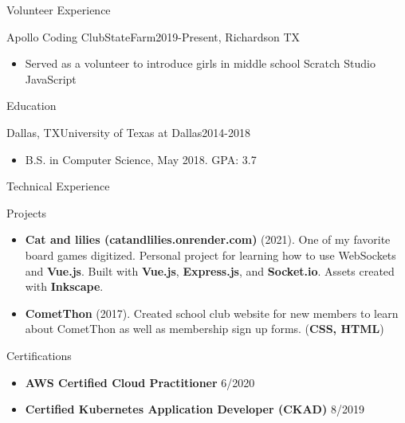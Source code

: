 \documentclass[]{lau}
\begin{document}
	\begin{cvsection}{Volunteer Experience}
		\begin{cvsubsection}{Apollo Coding Club}{StateFarm}{2019-Present, Richardson TX}
			\begin{itemize}
				\item Served as a volunteer to introduce girls in middle school Scratch Studio JavaScript
			\end{itemize}
		\end{cvsubsection}
	\end{cvsection}

	\begin{cvsection}{Education}
		\begin{cvsubsection}{Dallas, TX}{University of Texas at Dallas}{2014-2018}
			\begin{itemize}
				\item B.S. in Computer Science, May 2018. GPA: 3.7
			\end{itemize}
		\end{cvsubsection}
	\end{cvsection}

	\begin{cvsection}{Technical Experience}
		\begin{cvsubsection}{Projects}{}{}
			\begin{itemize}
				\item \textbf{Cat and lilies (catandlilies.onrender.com)} (2021). One of my favorite board games digitized. Personal project for learning how to use WebSockets and \textbf{Vue.js}. Built with \textbf{Vue.js}, \textbf{Express.js}, and \textbf{Socket.io}. Assets created with \textbf{Inkscape}.
				\item \textbf{CometThon} (2017). Created school club website for new members to learn about CometThon as well as membership sign up forms. (\textbf{CSS, HTML})
			\end{itemize}
		\end{cvsubsection}
	\end{cvsection}

	\begin{cvsection}{Certifications}
		\begin{cvsubsection}{}{}{}
			\begin{itemize}
				\item \textbf{AWS Certified Cloud Practitioner} 6/2020
				\item \textbf{Certified Kubernetes Application Developer (CKAD)} 8/2019
			\end{itemize}
		\end{cvsubsection}
	\end{cvsection}
\end{document}
